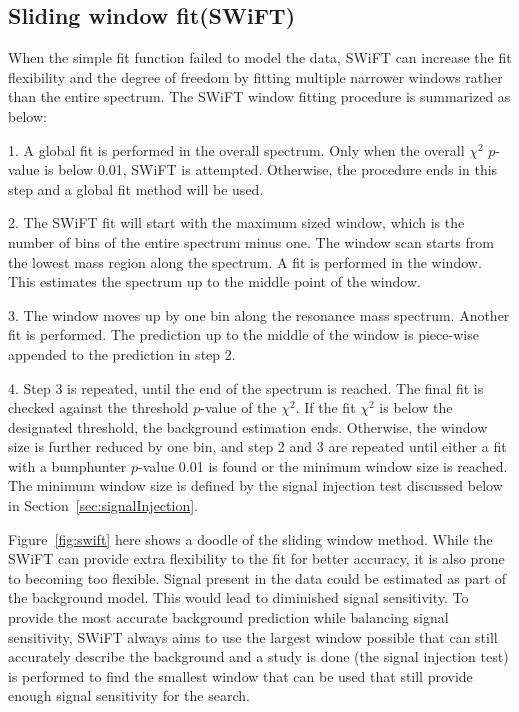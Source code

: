     \subsection{Sliding window fit(SWiFT)}
    When the simple fit function failed to model the data, SWiFT can increase the fit flexibility and the degree of freedom by fitting multiple narrower windows rather than the entire spectrum. The SWiFT window fitting procedure is summarized as below:
    
    1. A global fit is performed in the overall spectrum. Only when the overall $\chi^{2}$ $p$-value is below 0.01, SWiFT is attempted. Otherwise, the procedure ends in this step and a global fit method will be used. 

    2. The SWiFT fit will start with the maximum sized window, which is the number of bins of the entire spectrum minus one. The window scan starts from the lowest mass region along the spectrum. A fit is performed in the window. This estimates the spectrum up to the middle point of the window.

    3. The window moves up by one bin along the resonance mass spectrum. Another fit is performed. The prediction up to the middle of the window is piece-wise appended to the prediction in step 2. 

    4. Step 3 is repeated, until the end of the spectrum is reached. The final fit is checked against the threshold $p$-value of the $\chi^{2}$. If the fit $\chi^{2}$ is below the designated threshold, the background estimation ends. Otherwise, the window size is further reduced by one bin, and step 2 and 3 are repeated until either a fit with a bumphunter $p$-value 0.01 is found or the minimum window size is reached. The minimum window size is defined by the signal injection test discussed
    below in Section~\ref{sec:signalInjection}.

    Figure~\ref{fig:swift} here shows a doodle of the sliding window method.
    While the SWiFT can provide extra flexibility to the fit for better accuracy, it is also prone to becoming too flexible. Signal present in the data could be estimated as part of the background model. This would lead to diminished signal sensitivity. To provide the most accurate background prediction while balancing signal sensitivity, SWiFT always aims to use the largest window possible that can still accurately describe the background and a study is done (the signal injection test) is performed to find the smallest window that can be used that still provide enough signal sensitivity for the search.

